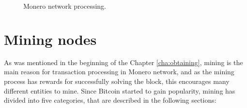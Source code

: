 \documentclass[
  printed, %
  table,   %
  nolof,     %
  nolot,     %
           oneside, color
]{fithesis3}
\begin{document}
\begin{figure}[H]
\caption{Monero network processing.}
\label{pict:network-processing}
\end{figure}
\newpage
\section{Mining nodes}
As was mentioned in the beginning of the Chapter \ref{cha:obtaining}, mining is the main reason for transaction processing in Monero network, and as the mining process has rewards for successfully solving the block, this encourages many different entities to mine.
Since Bitcoin started to gain popularity, mining has divided into five categories, that are described in the following sections:  

\end{document}
